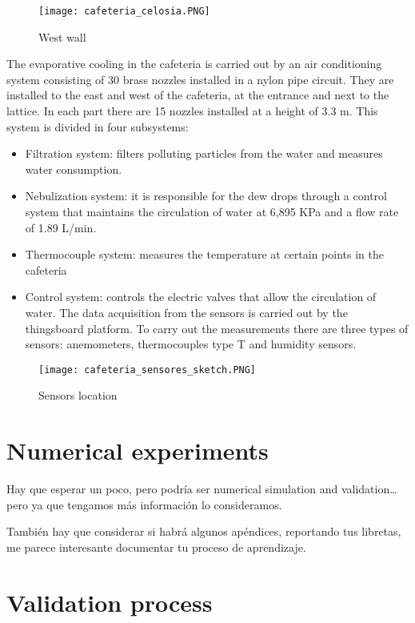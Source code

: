 \begin{figure}
 \centering
 \texttt{[image: cafeteria\_celosia.PNG]}
 \caption{West wall
 \label{fig:lattice}
 }
\end{figure}





The evaporative cooling in the cafeteria is carried out by an air conditioning system consisting of 30 brass nozzles installed in a nylon pipe circuit. They are installed to the east and west of the cafeteria, at the entrance and next to the lattice. In each part there are 15 nozzles installed at a height of 3.3 m. This system is divided in four subsystems:

\begin{itemize}
\item Filtration system: filters polluting particles from the water and measures water consumption.
\item Nebulization system: it is responsible for the dew drops through a control system that maintains the circulation of water at 6,895 KPa and a flow rate of 1.89 L/min.
\item Thermocouple system: measures the temperature at certain points in the cafeteria
\item Control system: controls the electric valves that allow the circulation of water.
The data acquisition from the sensors is carried out by the thingsboard platform. To carry out the measurements there are three types of sensors: anemometers, thermocouples type T and humidity sensors.
\end{itemize}

\begin{figure}
 \centering
 \texttt{[image: cafeteria\_sensores\_sketch.PNG]}
 \caption{Sensors location
 \label{fig:sensors}
 }
\end{figure}





 
 
 \section{Numerical experiments}
 
 Hay que esperar un poco, pero podría ser numerical simulation and validation… pero ya que tengamos más información lo consideramos.


También hay que considerar si habrá algunos apéndices, reportando tus libretas, me parece interesante documentar tu proceso de aprendizaje.
 
 \section{Validation process}
 
